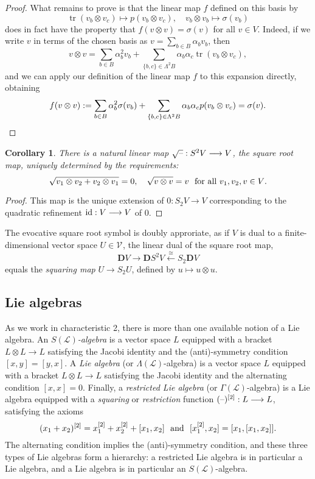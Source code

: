 \documentclass[11pt]{amsart}
\theoremstyle{plain}
\newtheorem{cor}[thm]{Corollary}
\theoremstyle{definition}
\DeclareMathOperator{\trace}{tr}
\newcommand{\DASH}{\textup{--}}
\renewcommand{\to}{\longrightarrow}
\newcommand{\from}{\longleftarrow}
\newcommand{\scrL}{\mathscr{L}}
\newcommand{\calV}{\mathcal{V}}
\theoremstyle{plain}
\newcommand{\LieOperad}{{\scrL}}
\newcommand{\restn}[1]{#1^{[2]}}
\newcommand{\vect}[2]{\calV^{#1}_{#2}}
\newcommand{\Id}{\textup{id}}
\newcommand{\dual}{\mathbf{D}}
\begin{document}
\begin{Conventions and notation}
\begin{proof}
What remains to prove is that the linear map $f$ defined on this basis by
\[\trace(v_b\otimes v_c)\mapsto p(v_b\otimes v_c),\quad v_b\otimes v_b\mapsto \sigma(v_b)\]
does in fact have the property that $f(v\otimes v)=\sigma(v)$ for \textup{all} $v\in V$. Indeed, if we write $v$ in terms of the chosen basis as $v=\sum_{b\in B}\alpha_bv_b$, then
\[v\otimes v
=
\sum_{b\in B}\alpha_b^2v_b+\sum_{\{b,c\}\in \Lambda^2B}\alpha_b\alpha_c\trace(v_b\otimes v_c),\]
and we can apply our definition of the linear map $f$ to this expansion directly, obtaining
\[f(v\otimes v):=
\sum_{b\in B}\alpha_b^2\sigma(v_b)+\sum_{\{b,c\}\in \Lambda^2B}\alpha_b\alpha_cp(v_b\otimes v_c)=\sigma(v).\qedhere\]
\end{proof}
\begin{cor}
There is a natural linear map $\sqrt{\DASH}:S^2V\to V$, the \emph{square root map}, uniquely determined by the requirements:
\[\sqrt{v_1\otimes v_2+v_2\otimes v_1}=0,\ \ \ \sqrt{v\otimes v}=v \textup{ \ for all $v_1,v_2,v\in V$}.\]
\end{cor}
\begin{proof}
This map is the unique extension of $0:S_2V\to V$ corresponding to the quadratic refinement $\Id:V\to V$ of $0$.
\end{proof}
\noindent The evocative square root symbol is doubly approriate, as if $V$ is dual to a finite-dimensional vector space $U\in\vect{}{}$, the linear dual of the square root map,
\[\dual V\to \dual S^2V\overset{\cong }{\from}S_2\dual V\]
equals the \emph{squaring map} $U\to S_2U$, defined by $u\mapsto u\otimes u$.


\subsection{Lie algebras}
As we work in characteristic 2, there is more than one available notion of a Lie algebra. An \emph{$S(\LieOperad)$-algebra} is a vector space $L$ equipped with a bracket $L\otimes L\to L$ satisfying the Jacobi identity and the (anti)-symmetry condition $[x,y]=[y,x]$. A \emph{Lie algebra} (or $\Lambda(\LieOperad)$-algebra) is a vector space $L$ equipped with a bracket $L\otimes L\to L$ satisfying the Jacobi identity and the alternating condition $[x,x]=0$. Finally, a \emph{restricted Lie algebra} \cite{CurtisSimplicialHtpy.pdf,6Author.pdf} (or $\Gamma(\LieOperad)$-algebra) is a Lie algebra equipped with a \emph{squaring} or \emph{restriction} function $\restn{(\DASH)}:L\to L$, satisfying the axioms
\[\restn{(x_1+x_2)}=\restn{x_1}+\restn{x_2}+[x_1,x_2]\textup{ \ and \ }[\restn{x_1},x_2]=[x_1,[x_1,x_2]].\]
The alternating condition implies the (anti)-symmetry condition, and these three types of Lie algebras form a hierarchy: a restricted Lie algebra is in particular a Lie algebra, and a Lie algebra is in particular an $S(\LieOperad)$-algebra.


\end{Conventions and notation}
\end{document}
